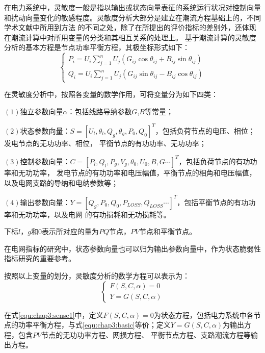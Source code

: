 在电力系统中，灵敏度一般是指以输出或状态向量表征的系统运行状况对控制向量和扰动向量变化的敏感程度。灵敏度分析大部分是建立在潮流方程基础上的，不同学术文献中所用到方法
的不同之处，除了在所提出的评价指标的差别外，还体现在潮流计算中对所用变量的分类和其相互关系的处理上。
基于潮流计算的灵敏度分析的基本方程是节点功率平衡方程，其极坐标形式如下：
\begin{equation}
  \left\{\begin{array}{l}{P_{i}=U_{i} \sum_{j=1}^{n} U_{j}\left(G_{i j} \cos \theta_{i j}+B_{i j} \sin \theta_{i j}\right)} \\ 
{Q_{i}=U_{i} \sum_{j=1}^{n} U_{j}\left(G_{i j} \sin \theta_{i j}-B_{i j} \cos \theta_{i j}\right)}\end{array}\right.  
\end{equation}

在灵敏度分析中，按照各变量的数学作用，可将变量分为如下四类：

$(1)$独立参数向量$\alpha$：包括线路导纳参数$G$,$B$等常量；

$(2)$状态参数向量：$S=\left[U_{l}, \theta_{l}, Q_{g}, \theta_{g}, P_{0}, Q_{0}\right]^{T}$，包括负荷节点的电压、相位；发电节点的无功功率、相位，
平衡节点的有功功率、无功功率；

$(3)$控制参数向量：$C=\left[P_{l}, Q_{l}, P_{g}, V_{g}, \theta_{0}, U_{0}, B, G \cdots\right]^{T}$，包括负荷节点的有功功率和无功功率，
发电节点的有功功率和电压幅值，平衡节点的相角和电压幅值，以及电网支路的导纳和电纳参数等；

$(4)$输出参数向量：$Y=\left[Q_{g}, P_{0}, Q_{0}, P_{L O S S}, Q_{L O S S} \cdots\right]^{T}$，包括平衡节点的有功功率和无功功率，以及电网
的有功损耗和无功损耗等。

下标$l$，$g$和$0$表示所对应的量为$PQ$节点，$PV$节点和平衡节点。

在电网指标的研究中，状态参数向量也可以归为输出参数向量中，作为状态脆弱性指标研究的重要参考。

按照以上变量的划分，灵敏度分析的数学方程可以表示为：
\begin{equation}
  \label{equ:chap3:sense1}
\left\{\begin{array}{l}{F(S, C, \alpha)=0} \\ {Y=G(S, C, \alpha)}\end{array}\right.
\end{equation}

在式\ref{equ:chap3:sense1}中，定义$F(S, C, \alpha)=0$为状态方程，包括电力系统中各节点的功率平衡方程，与式\ref{equ:chap3:basic}等价；定义$Y=G(S, C, \alpha)$为输出方程，包含$PV$节点的无功功率方程、网损方程、
平衡节点方程、支路潮流方程等输出方程。

